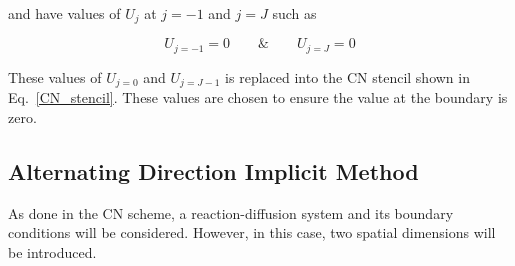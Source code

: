 and have values of $U_{j}$ at $j=-1$ and $j=J$ such as

\begin{equation}
    U_{j=-1} = 0  \quad \quad \&  \quad \quad  U_{j=J} = 0
\end{equation}

These values of $U_{j=0}$ and  $U_{j=J-1}$ is replaced into the CN stencil shown in Eq.~\ref{CN_stencil}.
These values are chosen to ensure the value at the boundary is zero.



\subsection{Alternating Direction Implicit Method}\label{ADI}
As done in the \acrshort{CN} scheme, a reaction-diffusion system and its boundary conditions will be considered. However, in this case, two spatial dimensions will be introduced.


